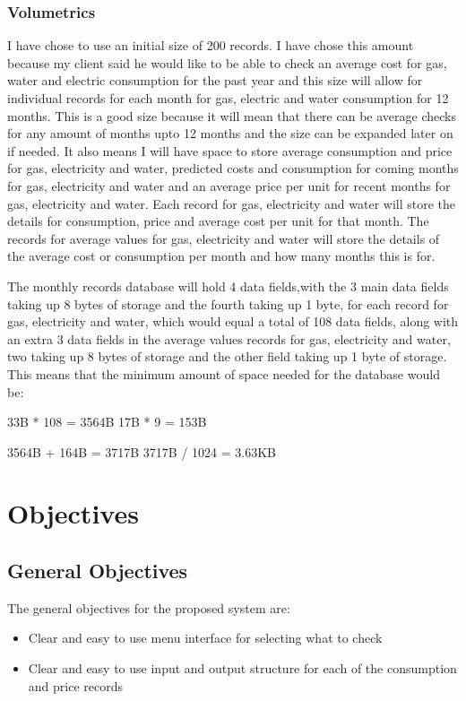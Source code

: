 \subsubsection{Volumetrics}
I have chose to use an initial size of 200 records. I have chose this amount because my client said he would like to be able to check an average cost for gas, water and electric consumption for the past year and this size will allow for individual records for each month for gas, electric and water consumption for 12 months. This is a good size because it will mean that there can be average checks for any amount of months upto 12 months and the size can be expanded later on if needed. It also means I will have space to store average consumption and price for gas, electricity and water, predicted costs and consumption for coming months for gas, electricity and water and an average price per unit for recent months for gas, electricity and water. Each record for gas, electricity and water will store the details for consumption, price and average cost per unit for that month. The records for average values for gas, electricity and water will store the details of the average cost or consumption per month and how many months this is for.

The monthly records database will hold 4 data fields,with the 3 main data fields taking up 8 bytes of storage and the fourth taking up 1 byte, for each record for gas, electricity and water, which would equal a total of 108 data fields, along with an extra 3 data fields in the average values records for gas, electricity and water, two taking up 8 bytes of storage and the other field taking up 1 byte of storage. This means that the minimum amount of space needed for the database would be:

33B * 108 = 3564B
17B * 9 = 153B

3564B + 164B = 3717B
3717B / 1024 = 3.63KB

\section{Objectives}

\subsection{General Objectives}
The general objectives for the proposed system are:
\begin{itemize}
	\item Clear and easy to use menu interface for selecting what to check
	\item Clear and easy to use input and output structure for each of the consumption and price records
\end{itemize}
